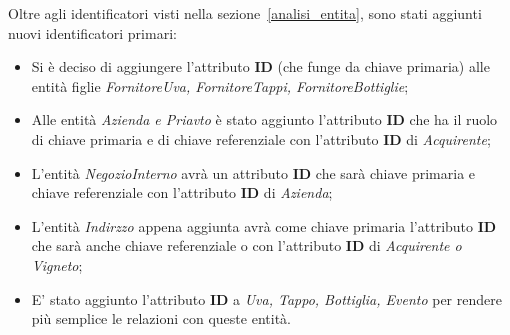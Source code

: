 Oltre agli identificatori visti nella sezione~\ref{analisi_entita}, sono stati aggiunti nuovi identificatori primari:

\begin{itemize}
	\item Si è deciso di aggiungere l'attributo \textbf{ID} (che funge da chiave primaria) alle entità figlie \emph{FornitoreUva, FornitoreTappi, FornitoreBottiglie};
	\item Alle entità \emph{Azienda e Priavto} è stato aggiunto l'attributo \textbf{ID} che ha il ruolo di chiave primaria e di chiave referenziale con l'attributo \textbf{ID} di \emph{Acquirente};
	\item L'entità \emph{NegozioInterno} avrà un attributo \textbf{ID} che sarà chiave primaria e chiave referenziale con l'attributo \textbf{ID} di \emph{Azienda};
	\item L'entità \emph{Indirzzo} appena aggiunta avrà come chiave primaria l'attributo \textbf{ID} che sarà anche chiave referenziale o con l'attributo \textbf{ID} di \emph{Acquirente o Vigneto};
	\item E' stato aggiunto l'attributo \textbf{ID} a \emph{Uva, Tappo, Bottiglia, Evento} per rendere più semplice le relazioni con queste entità.
\end{itemize}